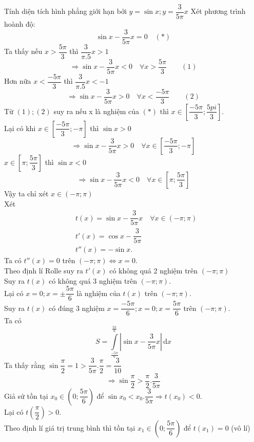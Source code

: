 \begin{ex}%
	Tính diện tích hình phẳng giới hạn bởi $ y=\sin x; y=\dfrac{3}{5\pi}x $
	\loigiai
	{Xét phương trình hoành độ:
		\[ \sin x-\dfrac{3}{5\pi}x=0\quad (*) \]
		Ta thấy nếu $ x>\dfrac{5\pi}{3} $ thì $ \dfrac{3}{\pi.5}x>1 $
		\[\Rightarrow\sin x-\dfrac{3}{5\pi}x<0 \quad \forall x>\dfrac{5\pi}{3}\qquad (1) \]
		Hơn nữa $ x<\dfrac{-5\pi}{3} $ thì $ \dfrac{3}{\pi.5}x<-1 $
		\[\Rightarrow\sin x-\dfrac{3}{5\pi}x>0 \quad \forall x<\dfrac{-5\pi}{3}\qquad (2) \]
		Từ $ (1); (2) $ suy ra nếu x là nghiệm của $ (*) $ thì $ x \in [\dfrac{-5\pi}{3};\dfrac{5pi}{3}] $.\\
		Lại có khi $ x \in [\dfrac{-5\pi}{3};-\pi] $ thì $ \sin x >0 $
		\[\Rightarrow\sin x-\dfrac{3}{5\pi}x>0 \quad \forall x \in [\dfrac{-5\pi}{3};-\pi] \]
		$ x \in [\pi;\dfrac{5\pi}{3}] $ thì $ \sin x <0 $
		\[\Rightarrow\sin x-\dfrac{3}{5\pi}x<0 \quad \forall x \in [\pi;\dfrac{5\pi}{3}] \]
		Vậy ta chỉ xét $ x 
		\in (-\pi;\pi) $\\
		Xét
		\begin{align*}
		&t(x)=\sin x-\dfrac{3}{5\pi}x \quad \forall x \in (-\pi;\pi)\\
		&t'(x)=\cos x-\dfrac{3}{5\pi}\\
		&	t''(x)=-\sin x.		
		\end{align*}
		Ta có $ t''(x)=0 $ trên $ (-\pi;\pi) \Leftrightarrow x=0$.\\
		Theo định lí Rolle suy ra $ t'(x) $ có không quá 2 nghiệm trên $ (-\pi;\pi) $\\
		Suy ra $ t(x) $ có không quá 3 nghiệm trên $ (-\pi;\pi) $.\\
		Lại có $ x=0;x=\pm \dfrac{5\pi}{6} $ là nghiệm của $ t(x) $ trên $ (-\pi;\pi) $.\\
		Suy ra $ t(x) $ có đúng 3 nghiệm $ x=\dfrac{-5\pi}{6};x=0;x=\dfrac{5\pi}{6} $ trên $ (-\pi;\pi) $.\\
		Ta có 
		\[S=\int\limits_{\frac{-5\pi}{6}}^{\frac{5\pi}{6}}|\sin x-\dfrac{3}{5\pi}x|\mathrm{\,d}x \]
		Ta thấy rằng $ \sin \dfrac{\pi}{2}=1>\dfrac{3}{5\pi}.\dfrac{\pi}{2}=\dfrac{3}{10} $\\
		\[\Rightarrow\sin \dfrac{\pi}{2}>\dfrac{\pi}{2}.\dfrac{3}{5\pi} \]
		Giả sử tồn tại $ x_0 \in (0;\dfrac{5\pi}{6}) $ để $ \sin x_0<x_0.\dfrac{3}{5\pi} \Rightarrow t(x_0)<0$.\\
		Lại có $ t(\dfrac{\pi}{2})>0 $.\\
		Theo định lí giá trị trung bình thì tồn tại $ x_1\in (0;\dfrac{5\pi}{6}) $ để $ t(x_1)=0 $ (vô lí)\\
}
\end{ex}
